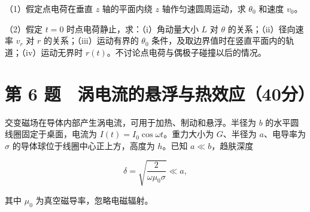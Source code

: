 \documentclass[12pt,a4paper,fontset=fandol]{ctexart}
\begin{document}
（1）假定点电荷在垂直 \(z\) 轴的平面内绕 \(z\) 轴作匀速圆周运动，求
\(\theta_0\) 和速度 \(v_0\)。

（2）假定 \(t=0\) 时点电荷静止，求：（i）角动量大小 \(L\) 对 \(\theta\)
的关系；（ii）径向速率 \(v_r\) 对 \(r\) 的关系；（iii）运动有界的
\(\theta_0\) 条件，及取边界值时在竖直平面内的轨道；（iv）运动无界时
\(r(t)\)。不讨论点电荷与偶极子碰撞以后的情况。

\clearpage

\section{第 6
题　涡电流的悬浮与热效应（40分）}\label{ux7b2c-6-ux9898-ux6da1ux7535ux6d41ux7684ux60acux6d6eux4e0eux70edux6548ux5e9440ux5206}

交变磁场在导体内部产生涡电流，可用于加热、制动和悬浮。半径为 \(b\)
的水平圆线圈固定于桌面，电流为 \(I(t)=I_0\cos\omega t\)。重力大小为
\(G\)、半径为 \(a\)、电导率为 \(\sigma\)
的导体球位于线圈中心正上方，高度为 \(h\)。已知 \(a\ll b\)，趋肤深度

\[\delta=\sqrt{\frac2{\omega\mu_0\sigma}}\ll a,\]

其中 \(\mu_0\) 为真空磁导率，忽略电磁辐射。

\begin{center}
\begin{minipage}{\linewidth}
\centering\begingroup{}
\ifdim\wd\diagrambox>.88\linewidth
\sbox{\diagrambox}{\resizebox{.88\linewidth}{!}{\usebox{\diagrambox}}}\fi
\ifdim\ht\diagrambox>.38\textheight
\resizebox{!}{.38\textheight}{\usebox{\diagrambox}}
\else\usebox{\diagrambox}\fi
\par{}\endgroup\end{minipage}\end{center}
\end{document}
